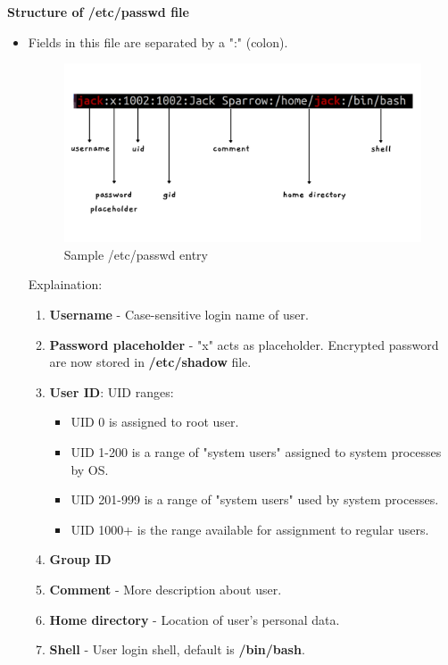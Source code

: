 \begin{flushleft}
\textbf{Structure of /etc/passwd file}
\begin{itemize}
	\item Fields in this file are separated by a ":" (colon).
	\begin{figure}[h!]
	\centering
	\includegraphics[scale=.2]{content/chapter4/images/53.png}
	\caption{Sample /etc/passwd entry}
	\label{fig:user_group1}
	\end{figure}	
	\newline
Explaination:
\begin{enumerate}
	\item \textbf{Username} - Case-sensitive login name of user.
	\item \textbf{Password placeholder} - "x" acts as placeholder. Encrypted password are now stored in \textbf{/etc/shadow} file.
	\item \textbf{User ID}: UID ranges:
		\begin{itemize}
		\item UID 0 is assigned to root user.
		\item UID 1-200 is a range of "system users" assigned to system processes by OS.
		\item UID 201-999 is a range of "system users" used by system processes.
		\item UID 1000+ is the range available for assignment to regular users.
	\end{itemize}
	\item \textbf{Group ID}
	\item \textbf{Comment} - More description about user.
	\item \textbf{Home directory} - Location of user's personal data.
	\item \textbf{Shell} - User login shell, default is \textbf{/bin/bash}.
\end{enumerate}

\end{itemize}	
\newpage




\end{flushleft}

